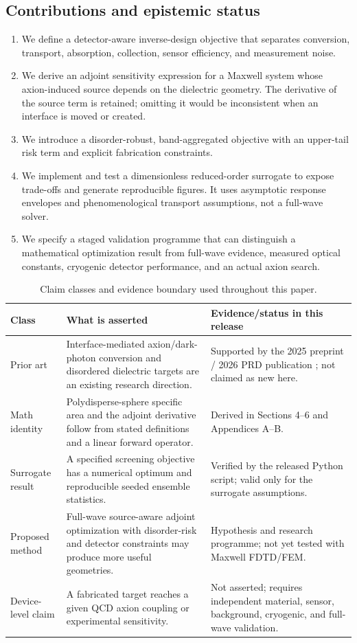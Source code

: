 \documentclass[10.5pt,a4paper]{article}
\begin{document}
\subsection{Contributions and epistemic status}
\begin{enumerate}
\item We define a detector-aware inverse-design objective that separates conversion, transport, absorption, collection, sensor efficiency, and measurement noise.
\item We derive an adjoint sensitivity expression for a Maxwell system whose axion-induced source depends on the dielectric geometry. The derivative of the source term is retained; omitting it would be inconsistent when an interface is moved or created.
\item We introduce a disorder-robust, band-aggregated objective with an upper-tail risk term and explicit fabrication constraints.
\item We implement and test a dimensionless reduced-order surrogate to expose trade-offs and generate reproducible figures. It uses asymptotic response envelopes and phenomenological transport assumptions, not a full-wave solver.
\item We specify a staged validation programme that can distinguish a mathematical optimization result from full-wave evidence, measured optical constants, cryogenic detector performance, and an actual axion search.
\end{enumerate}

\begin{table}[H]
\centering\small
\caption{Claim classes and evidence boundary used throughout this paper.}
\begin{tabularx}{\textwidth}{p{}YY}
\toprule
Class & What is asserted & Evidence/status in this release\\
\midrule
Prior art & Interface-mediated axion/dark-photon conversion and disordered dielectric targets are an existing research direction. & Supported by the 2025 preprint / 2026 PRD publication \parencite{Koppell2026}; not claimed as new here.\\
Math identity & Polydisperse-sphere specific area and the adjoint derivative follow from stated definitions and a linear forward operator. & Derived in Sections 4--6 and Appendices A--B.\\
Surrogate result & A specified screening objective has a numerical optimum and reproducible seeded ensemble statistics. & Verified by the released Python script; valid only for the surrogate assumptions.\\
Proposed method & Full-wave source-aware adjoint optimization with disorder-risk and detector constraints may produce more useful geometries. & Hypothesis and research programme; not yet tested with Maxwell FDTD/FEM.\\
Device-level claim & A fabricated target reaches a given QCD axion coupling or experimental sensitivity. & Not asserted; requires independent material, sensor, background, cryogenic, and full-wave validation.\\
\bottomrule
\end{tabularx}
\end{table}
\end{document}
